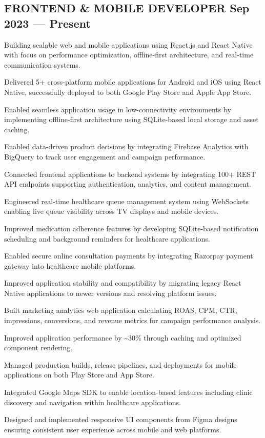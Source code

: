 \subsection{FRONTEND \& MOBILE DEVELOPER \hfill \color{highlight} Sep 2023 --- Present}
\vspace{0.8em}
Building scalable web and mobile applications using React.js and React Native with focus on performance optimization, offline-first architecture, and real-time communication systems.
\begin{zitemize}
    \item Delivered 5+ cross-platform mobile applications for Android and iOS using React Native, successfully deployed to both Google Play Store and Apple App Store.
    \item Enabled seamless application usage in low-connectivity environments by implementing offline-first architecture using SQLite-based local storage and asset caching.
    \item Enabled data-driven product decisions by integrating Firebase Analytics with BigQuery to track user engagement and campaign performance.
    \item Connected frontend applications to backend systems by integrating 100+ REST API endpoints supporting authentication, analytics, and content management.
    \item Engineered real-time healthcare queue management system using WebSockets enabling live queue visibility across TV displays and mobile devices.
    \item Improved medication adherence features by developing SQLite-based notification scheduling and background reminders for healthcare applications.
    \item Enabled secure online consultation payments by integrating Razorpay payment gateway into healthcare mobile platforms.
    \item Improved application stability and compatibility by migrating legacy React Native applications to newer versions and resolving platform issues.
    \item Built marketing analytics web application calculating ROAS, CPM, CTR, impressions, conversions, and revenue metrics for campaign performance analysis.
    \item Improved application performance by \textasciitilde{}30\% through caching and optimized component rendering.
    \item Managed production builds, release pipelines, and deployments for mobile applications on both Play Store and App Store.
    \item Integrated Google Maps SDK to enable location-based features including clinic discovery and navigation within healthcare applications.
    \item Designed and implemented responsive UI components from Figma designs ensuring consistent user experience across mobile and web platforms.
\end{zitemize}